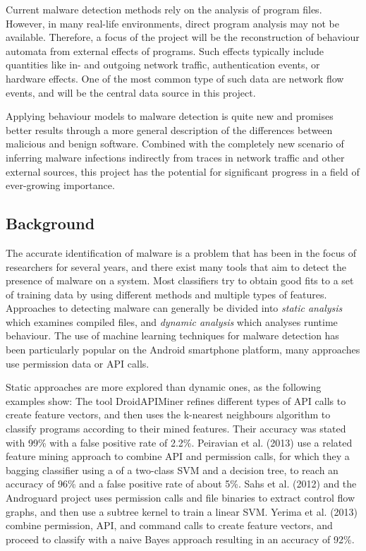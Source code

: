 \documentclass[a4paper,12pt,twoside]{report}
\begin{document}
Current malware detection methods rely on the analysis of program files. However, in many real-life environments, direct program analysis may not be available. Therefore, a focus of the project will be the reconstruction of behaviour automata from external effects of programs. Such effects typically include quantities like in- and outgoing network traffic, authentication events, or hardware effects. One of the most common type of such data are network flow events, and will be the central data source in this project.

Applying  behaviour models to malware detection is quite new and promises better results through a more general description of the differences between malicious and benign software. Combined with the completely new scenario of inferring malware infections indirectly from traces in network traffic and other external sources, this project has the potential for significant progress in a field of ever-growing importance.

\subsection{Background}

The accurate identification of malware is a problem that has been in the focus of researchers for several years, and there exist many tools that aim to detect  the presence of malware on a system. Most classifiers   try  to  obtain  good  fits  to a set of training data  by using different methods and multiple types of features. Approaches to detecting malware can generally be divided into \textit{static analysis} which examines compiled files, and \textit{dynamic analysis} which analyses runtime behaviour. The use of machine learning techniques for malware detection has been particularly popular on the Android smartphone platform, many approaches use permission data or API calls. 


Static approaches are more explored than dynamic ones, as the following examples show: The tool DroidAPIMiner \cite{aafer2013droidapiminer} refines different types of API calls  to create feature vectors, and then uses the k-nearest neighbours algorithm to classify programs according to their mined features. Their accuracy was stated with 99\% with a false positive rate of 2.2\%. Peiravian et al. (2013) \cite{peiravian2013machine} use a related feature mining approach to combine API and permission calls, for which they a bagging classifier using a of a two-class SVM and a decision tree, to reach an accuracy of 96\% and a false positive rate of about 5\%. Sahs et al. (2012) \cite{sahs2012machine} and the Androguard project uses permission calls and file binaries to extract control flow graphs, and then use a subtree kernel to train a linear SVM. Yerima et al. (2013) \cite{yerima2013new} combine permission, API, and command calls to create feature vectors, and proceed to classify with a naive Bayes approach resulting in an accuracy of 92\%. 
\end{document}
